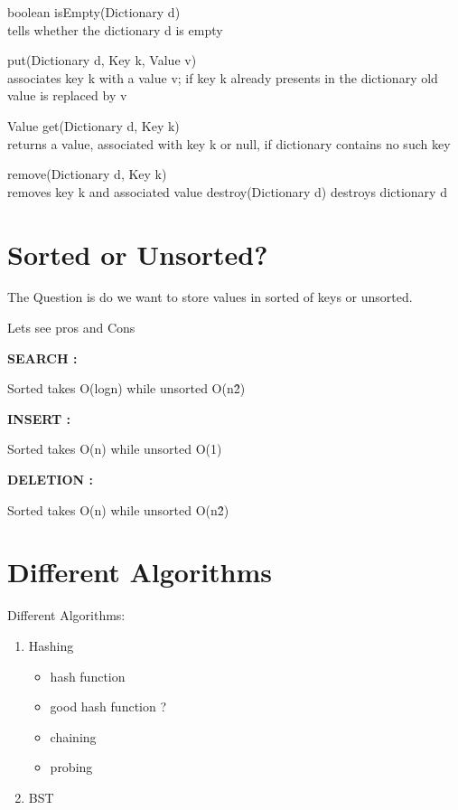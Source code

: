 \documentclass{report}
\begin{document}
    boolean isEmpty(Dictionary d)\\
    tells whether the dictionary d is empty
    
\vspace{0.5cm}

    put(Dictionary d, Key k, Value v)\\
    associates key k with a value v;
    if key k already presents in the dictionary
    old value is replaced by v
    
\vspace{0.5cm}

    Value get(Dictionary d, Key k)\\
    returns a value, associated with key k
    or null, if dictionary contains no such key
    
\vspace{0.5cm}

    remove(Dictionary d, Key k)\\
    removes key k and associated value
    destroy(Dictionary d)
    destroys dictionary d
\newpage
\chapter{\Large Sorted or Unsorted?}
The Question is do we want to store values in sorted of keys or unsorted.

\vspace{1cm}

Lets see pros and Cons

\vspace{1cm}

\textbf{\large SEARCH :} 
\vspace{1cm}

Sorted takes O(logn) while unsorted O(n\^2)

\vspace{1cm}

\textbf{\large INSERT :}

\vspace{1cm}

Sorted takes O(n) while unsorted O(1)

\vspace{1cm}

\textbf{\large DELETION :}

\vspace{1cm}

Sorted takes O(n) while unsorted O(n\^2)
\newpage
\chapter{\Large Different Algorithms}
\Large Different Algorithms:
\begin{enumerate}
    \item \large Hashing
    \begin{itemize}
            \item hash function
            \item good hash function ?
            \item chaining
            \item probing
        \end{itemize}
    \item \large BST
\end{enumerate}
\end{document}
